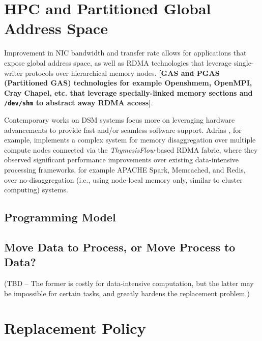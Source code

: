 \documentclass{article}
\begin{document}

\section{HPC and Partitioned Global Address Space}
Improvement in NIC bandwidth and transfer rate allows for applications that expose
global address space, as well as RDMA technologies that leverage single-writer
protocols over hierarchical memory nodes. \textbf{[GAS and PGAS (Partitioned GAS)
technologies for example Openshmem, OpenMPI, Cray Chapel, etc. that leverage
specially-linked memory sections and \texttt{/dev/shm} to abstract away RDMA access]}.


Contemporary works on DSM systems focus more on leveraging hardware advancements
to provide fast and/or seamless software support. Adrias \cite{Masouros_etal.Adrias.2023},
for example, implements a complex system for memory disaggregation over multiple
compute nodes connected via the \textit{ThymesisFlow}-based RDMA fabric, where
they observed significant performance improvements over existing data-intensive
processing frameworks, for example APACHE Spark, Memcached, and Redis, over
no-disaggregation (i.e., using node-local memory only, similar to cluster computing)
systems.

\subsection{Programming Model}

\subsection{Move Data to Process, or Move Process to Data?}
(TBD -- The former is costly for data-intensive computation, but the latter may
be impossible for certain tasks, and greatly hardens the replacement problem.)

\section{Replacement Policy}
\end{document}
